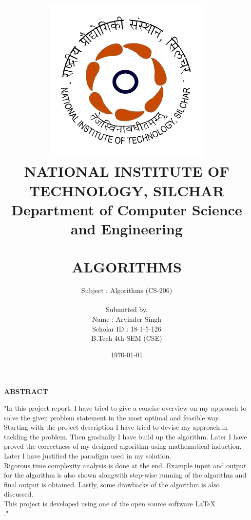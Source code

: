 \documentclass[12pt,a4paper]{article}%
\begin{document}
	
	
	\begin{titlepage}
		\title{\includegraphics[width=0.38 \textwidth]{./NIT_Silchar_logo.png}\\\textbf{\large NATIONAL INSTITUTE OF TECHNOLOGY, SILCHAR}\\\textbf{{\large Department of Computer Science and Engineering}}\\\\\bigskip\textbf{{\normalsize ALGORITHMS }}}
		\author{Subject : Algorithms (CS-$206$)\\\\ Submitted by,\\Name : Arvinder Singh\\Scholar ID : 18-1-5-126\\B.Tech 4th SEM (CSE)}
		\date{\today}
		\clearpage\maketitle
		\thispagestyle{empty}
	\end{titlepage}
	
	\begin{center}
		\textbf{\large ABSTRACT}
	\end{center}
    \begin{flushleft}  \fontsize{12pt}{18pt}\selectfont
		"In this project report, I have tried to give a concise overview on my approach to solve the given problem statement in the most optimal and feasible way.\\\bigskip Starting with the project description I have tried to devise my approach in tackling the problem. Then gradually I have build up the algorithm. Later I have proved the correctness of my designed algorithm using mathematical induction. Later I have justified the paradigm used in my solution. \\\bigskip Rigorous time complexity analysis is done at the end. Example input and output for the algorithm is also shown alongwith step-wise running of the algorithm and final output is obtained. Lastly, some drawbacks of the algorithm is also discussed.\\\bigskip This project is developed using one of the open source software \LaTeX\\." 
	\end{flushleft}
	
\end{document}
